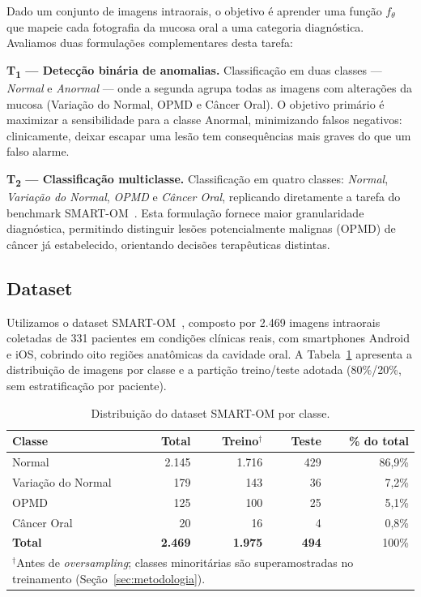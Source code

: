 \documentclass[12pt]{article}
\begin{document}
Dado um conjunto de imagens intraorais, o objetivo é aprender uma função
$f_\theta$ que mapeie cada fotografia da mucosa oral a uma categoria
diagnóstica. Avaliamos duas formulações complementares desta tarefa:

\textbf{T\textsubscript{1} — Detecção binária de anomalias.}
Classificação em duas classes — \textit{Normal} e \textit{Anormal} —
onde a segunda agrupa todas as imagens com alterações da mucosa
(Variação do Normal, OPMD e Câncer Oral).
O objetivo primário é maximizar a sensibilidade para a classe Anormal,
minimizando falsos negativos: clinicamente, deixar escapar uma lesão
tem consequências mais graves do que um falso alarme.

\textbf{T\textsubscript{2} — Classificação multiclasse.}
Classificação em quatro classes: \textit{Normal}, \textit{Variação do
Normal}, \textit{OPMD} e \textit{Câncer Oral}, replicando diretamente
a tarefa do benchmark SMART-OM~\cite{smartom}.
Esta formulação fornece maior granularidade diagnóstica, permitindo
distinguir lesões potencialmente malignas (OPMD) de câncer já
estabelecido, orientando decisões terapêuticas distintas.

\subsection{Dataset}

Utilizamos o dataset SMART-OM~\cite{smartom}, composto por 2.469 imagens
intraorais coletadas de 331 pacientes em condições clínicas reais, com
smartphones Android e iOS, cobrindo oito regiões anatômicas da cavidade oral.
A Tabela~\ref{tab:dataset} apresenta a distribuição de imagens por classe
e a partição treino/teste adotada (80\%/20\%, sem estratificação por
paciente).

\begin{table}[ht]
  \centering
  \caption{Distribuição do dataset SMART-OM por classe.}
  \label{tab:dataset}
  \begin{tabular}{lrrrr}
    \toprule
    Classe & Total & Treino$^\dagger$ & Teste & \% do total \\
    \midrule
    Normal             & 2.145 & 1.716 & 429 & 86,9\% \\
    Variação do Normal &   179 &   143 &  36 &  7,2\% \\
    OPMD               &   125 &   100 &  25 &  5,1\% \\
    Câncer Oral        &    20 &    16 &   4 &  0,8\% \\
    \midrule
    \textbf{Total}     & \textbf{2.469} & \textbf{1.975} & \textbf{494} & 100\% \\
    \bottomrule
    \multicolumn{5}{l}{\footnotesize{$^\dagger$Antes de \textit{oversampling};
    classes minoritárias são superamostradas no treinamento (Seção~\ref{sec:metodologia}).}}
  \end{tabular}
\end{table}
\end{document}
